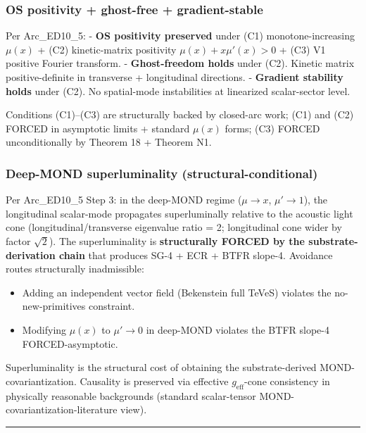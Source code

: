 \documentclass[
]{article}
\providecommand{\tightlist}{%
  \setlength{\itemsep}{0pt}\setlength{\parskip}{0pt}}
\begin{document}
\subsubsection{OS positivity + ghost-free +
gradient-stable}\label{os-positivity-ghost-free-gradient-stable}

Per Arc\_ED10\_5: - \textbf{OS positivity preserved} under (C1)
monotone-increasing \(\mu(x)\) + (C2) kinetic-matrix positivity
\(\mu(x) + x\mu'(x) > 0\) + (C3) V1 positive Fourier transform. -
\textbf{Ghost-freedom holds} under (C2). Kinetic matrix
positive-definite in transverse + longitudinal directions. -
\textbf{Gradient stability holds} under (C2). No spatial-mode
instabilities at linearized scalar-sector level.

Conditions (C1)--(C3) are structurally backed by closed-arc work; (C1)
and (C2) FORCED in asymptotic limits + standard \(\mu(x)\) forms; (C3)
FORCED unconditionally by Theorem 18 + Theorem N1.

\subsubsection{Deep-MOND superluminality
(structural-conditional)}\label{deep-mond-superluminality-structural-conditional}

Per Arc\_ED10\_5 Step 3: in the deep-MOND regime (\(\mu \to x\),
\(\mu' \to 1\)), the longitudinal scalar-mode propagates superluminally
relative to the acoustic light cone (longitudinal/transverse eigenvalue
ratio = 2; longitudinal cone wider by factor \(\sqrt{2}\)). The
superluminality is \textbf{structurally FORCED by the
substrate-derivation chain} that produces SG-4 + ECR + BTFR slope-4.
Avoidance routes structurally inadmissible:

\begin{itemize}
\tightlist
\item
  Adding an independent vector field (Bekenstein full TeVeS) violates
  the no-new-primitives constraint.
\item
  Modifying \(\mu(x)\) to \(\mu' \to 0\) in deep-MOND violates the BTFR
  slope-4 FORCED-asymptotic.
\end{itemize}

Superluminality is the structural cost of obtaining the
substrate-derived MOND-covariantization. Causality is preserved via
effective \(g_\mathrm{eff}\)-cone consistency in physically reasonable
backgrounds (standard scalar-tensor MOND-covariantization-literature
view).

\begin{center}\rule{0.5\linewidth}{0.5pt}\end{center}
\end{document}

